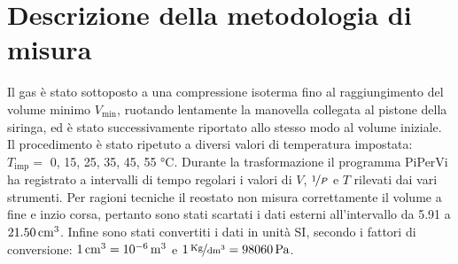 \documentclass[italian,a4paper]{article}
\begin{document}
\section{Descrizione della metodologia di misura}
Il gas è stato sottoposto a una compressione isoterma fino al raggiungimento del volume minimo $V_{\text{min}}$, ruotando lentamente la manovella collegata al pistone della siringa, ed è stato successivamente riportato allo stesso modo al volume iniziale. Il procedimento è stato ripetuto a diversi valori di temperatura impostata: $T_{\text{imp}} =$ 0, 15, 25, 35, 45, 55 \unit{\celsius}. Durante la trasformazione il programma PiPerVi ha registrato a intervalli di tempo regolari i valori di $V$, $\nicefrac{1}{P}$ e $T$ rilevati dai vari strumenti. Per ragioni tecniche il reostato non misura correttamente il volume a fine e inzio corsa, pertanto sono stati scartati i dati esterni all'intervallo da 5.91 a  $\unit[21.50]{cm^3}$.
Infine sono stati convertiti i dati in unità SI, secondo i fattori di conversione: $\unit[1]{cm^3}=\unit[10^{-6}]{m^3}$ e $\unitfrac[1]{Kg}{dm^3}=\unit[98060]{Pa}$.
\end{document}
